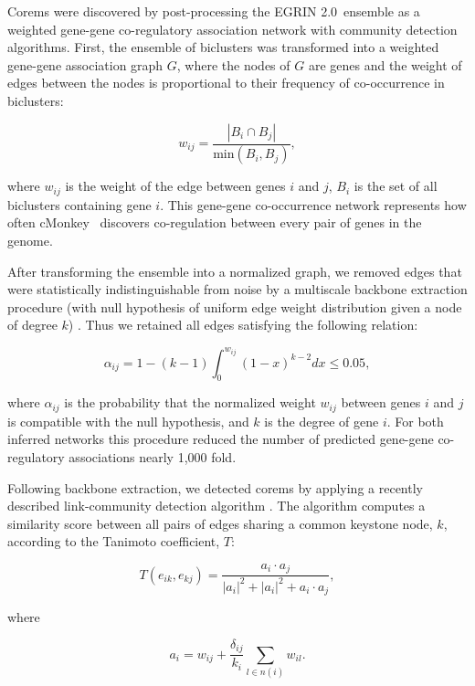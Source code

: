 \documentclass{article}
\newcommand{\tmsamp}[1]{\textsf{#1}}
\newcommand{\cm}{\tmsamp{cMonkey}}
\newcommand{\egrine}{{\tmsamp{EGRIN 2.0}}}
\begin{document}
Corems were discovered by post-processing the \egrine~ensemble as a weighted gene-gene co-regulatory association network with community detection algorithms. First, the ensemble of biclusters was transformed into a weighted gene-gene association graph $G$, where the nodes of $G$ are genes and the weight of edges between the nodes is proportional to their frequency of co-occurrence in biclusters:

\begin{equation}
w_{ij} = \frac{\left|B_i\cap B_j\right|}{\mathrm{min}(B_i,B_j)},
\end{equation}

\noindent where $w_{ij}$ is the weight of the edge between genes $i$ and $j$, $B_i$ is the set of all biclusters containing gene $i$. This gene-gene co-occurrence network represents how often \cm~ discovers co-regulation between every pair of genes in the genome.

After transforming the ensemble into a normalized graph, we removed edges that were statistically indistinguishable from noise by a multiscale backbone extraction procedure (with null hypothesis of uniform edge weight distribution given a node of degree $k$) \cite{serrano_extracting_2009}. Thus we retained all edges satisfying the following relation:

\begin{equation}
\alpha_{ij}=1-(k-1)\int_0^{w_{ij}}(1-x)^{k-2}dx\leq 0.05,
\end{equation}

\noindent where $\alpha_{ij}$ is the probability that the normalized weight $w_{ij}$ between genes $i$ and $j$ is compatible with the null hypothesis, and $k$ is the degree of gene $i$. For both inferred networks this procedure reduced the number of predicted gene-gene co-regulatory associations nearly 1,000 fold.

Following backbone extraction, we detected corems by applying a recently described link-community detection algorithm \cite{ahn_link_2010}. The algorithm computes a similarity score between all pairs of edges sharing a common keystone node, $k$, according to the Tanimoto coefficient, $T$:

\begin{equation}
T(e_{ik},e_{kj}) = \frac{a_i\cdot a_j}{|a_i|^2+|a_i|^2+a_i\cdot a_j},
\end{equation}

\noindent where

\begin{equation}
a_i=w_{ij}+\frac{\delta_{ij}}{k_i}\sum_{l\in n(i)}w_{il}.
\end{equation}
\end{document}
